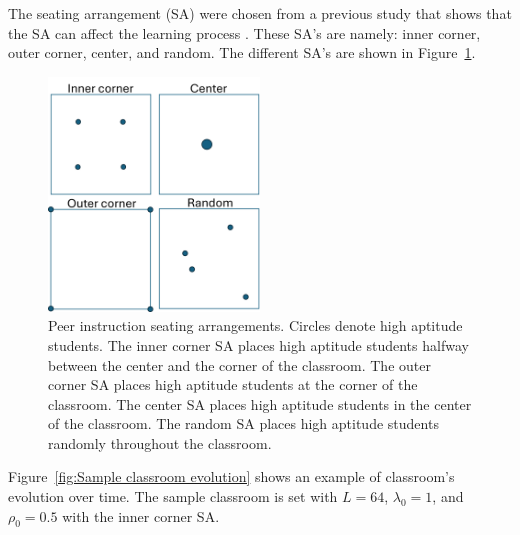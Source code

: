 The seating arrangement (SA) were chosen from a previous study that shows that the SA can affect the learning process \cite{roxas2010seating}. 
These SA's are namely: inner corner, outer corner, center, and random. The different SA's are shown in Figure~\ref{fig:PI SAs}.

 \begin{figure}[htbp!]
    \centering
    \includegraphics[width=0.5\textwidth]{figures/PI SAs.png}
    \caption[Peer instruction seating arrangements.]{ Peer instruction seating arrangements. 
    Circles denote high aptitude students. 
    The inner corner SA places high aptitude students halfway between the center and the corner of the classroom. 
    The outer corner SA places high aptitude students at the corner of the classroom. 
    The center SA places high aptitude students in the center of the classroom. 
    The random SA places high aptitude students randomly throughout the classroom.}
    \label{fig:PI SAs}
 \end{figure}

 Figure~\ref{fig:Sample classroom evolution} shows an example of classroom's evolution over time. The sample classroom is set with $L=64$, $\lambda_0 = 1$, and $\rho_0 = 0.5$ with the inner corner SA.

